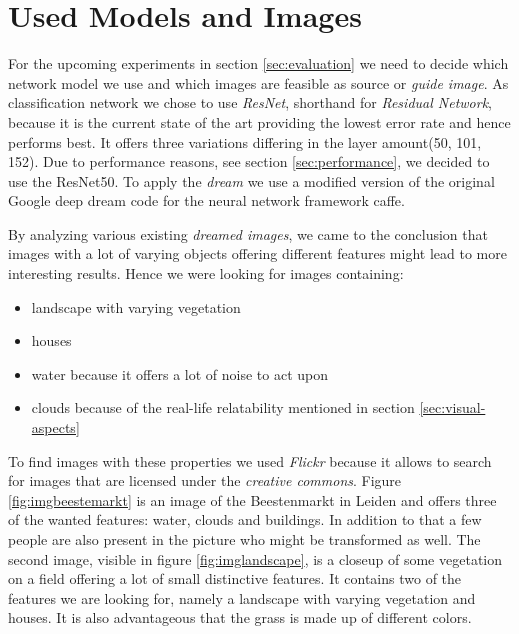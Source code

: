 \section{Used Models and Images}
\label{sec:data}
For the upcoming experiments in section \ref{sec:evaluation} we need to decide which network model we use and which images are feasible as source or \emph{guide image}.
As classification network we chose to use \emph{ResNet}\cite{he2016deep}, shorthand for \emph{Residual Network}, because it is the current state of the art providing the lowest error rate and hence performs best.\cite{cnnComparison}
It offers three variations differing in the layer amount(50, 101, 152).
Due to performance reasons, see section \ref{sec:performance}, we decided to use the ResNet50.
To apply the \emph{dream} we use a modified version of the original Google deep dream code\cite{deep-dream-github} for the neural network framework caffe.\cite{jia2014caffe}

By analyzing various existing \emph{dreamed images}, we came to the conclusion that images with a lot of varying objects offering different features might lead to more interesting results.
Hence we were looking for images containing: 
\begin{itemize}
	\item landscape with varying vegetation
	\item houses
	\item water because it offers a lot of noise to act upon
	\item clouds because of the real-life relatability mentioned in section \ref{sec:visual-aspects}
\end{itemize}

To find images with these properties we used \emph{Flickr} because it allows to search for images that are licensed under the \emph{creative commons}.
Figure \ref{fig:imgbeestemarkt} is an image of the Beestenmarkt in Leiden and offers three of the wanted features: water, clouds and buildings.
In addition to that a few people are also present in the picture who might be transformed as well.
The second image, visible in figure \ref{fig:imglandscape}, is a closeup of some vegetation on a field offering a lot of small distinctive features.
It contains two of the features we are looking for, namely a landscape with varying vegetation and houses.
It is also advantageous that the grass is made up of different colors.



